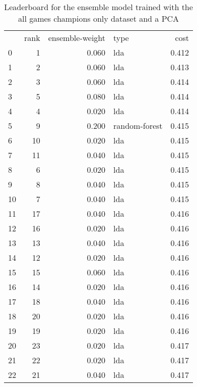\begin{table}[]
	\centering
	\begin{tabular}{lrrlr}
		   & rank & ensemble-weight & type          & cost  \\
		0  & 1    & 0.060           & lda           & 0.412 \\
		1  & 2    & 0.060           & lda           & 0.413 \\
		2  & 3    & 0.060           & lda           & 0.414 \\
		3  & 5    & 0.080           & lda           & 0.414 \\
		4  & 4    & 0.020           & lda           & 0.414 \\
		5  & 9    & 0.200           & random-forest & 0.415 \\
		6  & 10   & 0.020           & lda           & 0.415 \\
		7  & 11   & 0.040           & lda           & 0.415 \\
		8  & 6    & 0.020           & lda           & 0.415 \\
		9  & 8    & 0.040           & lda           & 0.415 \\
		10 & 7    & 0.040           & lda           & 0.415 \\
		11 & 17   & 0.040           & lda           & 0.416 \\
		12 & 16   & 0.020           & lda           & 0.416 \\
		13 & 13   & 0.040           & lda           & 0.416 \\
		14 & 12   & 0.020           & lda           & 0.416 \\
		15 & 15   & 0.060           & lda           & 0.416 \\
		16 & 14   & 0.020           & lda           & 0.416 \\
		17 & 18   & 0.040           & lda           & 0.416 \\
		18 & 20   & 0.020           & lda           & 0.416 \\
		19 & 19   & 0.020           & lda           & 0.416 \\
		20 & 23   & 0.020           & lda           & 0.417 \\
		21 & 22   & 0.020           & lda           & 0.417 \\
		22 & 21   & 0.040           & lda           & 0.417 \\
	\end{tabular}

	\caption{Leaderboard for the ensemble model trained with the all games champions only dataset and a PCA}
	\label{tab:lb-all-games-champs-only-PCA}
\end{table}

